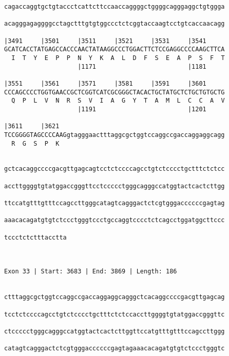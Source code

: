 \documentclass{article}
\begin{document}
\begin{Verbatim}
cagaccaggtgctgtaccctcattcttccaaccaggggctggggcagggaggctgtggga
                                                            
acagggagaggggcctagctttgtgtggccctctcggtaccaagtcctgtcaccaacagg
                                                            
|3491     |3501     |3511     |3521     |3531     |3541     
GCATCACCTATGAGCCACCCAACTATAAGGCCCTGGACTTCTCCGAGGCCCCAAGCTTCA
  I  T  Y  E  P  P  N  Y  K  A  L  D  F  S  E  A  P  S  F  T
                    |1171                         |1181     
  
|3551     |3561     |3571     |3581     |3591     |3601     
CCCAGCCCCTGGTGAACCGCTCGGTCATCGCGGGCTACACTGCTATGCTCTGCTGTGCTG
  Q  P  L  V  N  R  S  V  I  A  G  Y  T  A  M  L  C  C  A  V
                    |1191                         |1201     
  
|3611     |3621                                             
TCCGGGGTAGCCCCAAGgtagggaactttaggcgctggtccaggccgaccaggaggcagg
  R  G  S  P  K                                             
                                                            
  
gctcacaggccccgacgttgagcagtcctctccccagcctgtctcccctgctttctctcc
                                                            
accttggggtgtatggaccgggttcctccccctgggcagggccatggtactcactcttgg
                                                            
ttccatgtttgtttccagccttgggcatagtcagggactctcgtgggaccccccgagtag
                                                            
aaacacagatgtgtctccctgggtccctgccaggtcccctctcagcctggatggcttccc
                                                            
tccctctctttacctta
                 
                 
 
Exon 33 | Start: 3683 | End: 3869 | Length: 186


ctttaggcgctggtccaggccgaccaggaggcagggctcacaggccccgacgttgagcag
                                                            
tcctctccccagcctgtctcccctgctttctctccaccttggggtgtatggaccgggttc
                                                            
ctccccctgggcagggccatggtactcactcttggttccatgtttgtttccagccttggg
                                                            
catagtcagggactctcgtgggaccccccgagtagaaacacagatgtgtctccctgggtc
                                                            

\end{Verbatim}
\end{document}
